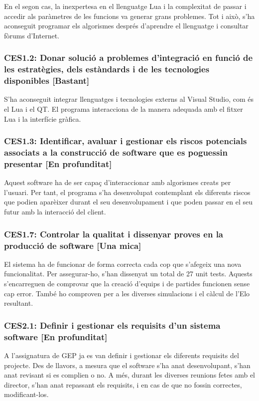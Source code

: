 \documentclass[a4paper]{article}
\begin{document}
En el segon cas, la inexpertesa en el llenguatge Lua i la complexitat de passar i accedir als paràmetres de les funcions va generar grans problemes. Tot i això, s'ha aconseguit programar els algorismes després d'aprendre el llenguatge i consultar fòrums d'Internet.

\subsubsection*{CES1.2: Donar solució a problemes d'integració en funció de les estratègies, dels estàndards i de les tecnologies disponibles [Bastant]}

S'ha aconseguit integrar llenguatges i tecnologies externs al Visual Studio, com és el Lua i el QT. El programa interacciona de la manera adequada amb el fitxer Lua i la interfície gràfica. 

\subsubsection*{CES1.3: Identificar, avaluar i gestionar els riscos potencials associats a la construcció de software que es poguessin presentar [En profunditat]}

Aquest software ha de ser capaç d'interaccionar amb algorismes creats per l'usuari. Per tant, el programa s'ha desenvolupat contemplant els diferents riscos que podien aparèixer durant el seu desenvolupament i que poden passar en el seu futur amb la interacció del client.

\subsubsection*{CES1.7: Controlar la qualitat i dissenyar proves en la producció de software [Una mica]}

El sistema ha de funcionar de forma correcta cada cop que s'afegeix una nova funcionalitat. Per assegurar-ho, s'han dissenyat un total de 27 unit tests. Aquests s'encarreguen de comprovar que la creació d'equips i de partides funcionen sense cap error. També ho comproven per a les diverses simulacions i el càlcul de l'Elo resultant.

\subsubsection*{CES2.1: Definir i gestionar els requisits d'un sistema software [En profunditat]}

A l'assignatura de GEP ja es van definir i gestionar els diferents requisits del projecte. Des de llavors, a mesura que el software s'ha anat desenvolupant, s'han anat revisant si es complien o no. A més, durant les diverses reunions fetes amb el director, s'han anat repassant els requisits, i en cas de que no fossin correctes, modificant-los.
\end{document}

